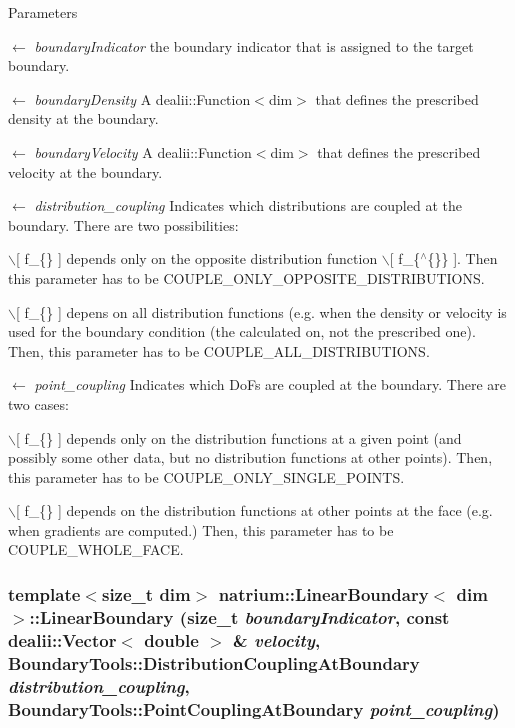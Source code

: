 \begin{DoxyParams}{Parameters}
\item[\mbox{$\leftarrow$} {\em boundaryIndicator}]the boundary indicator that is assigned to the target boundary. \item[\mbox{$\leftarrow$} {\em boundaryDensity}]A dealii::Function$<$dim$>$ that defines the prescribed density at the boundary. \item[\mbox{$\leftarrow$} {\em boundaryVelocity}]A dealii::Function$<$dim$>$ that defines the prescribed velocity at the boundary. \item[\mbox{$\leftarrow$} {\em distribution\_\-coupling}]Indicates which distributions are coupled at the boundary. There are two possibilities:
\begin{DoxyEnumerate}
\item $\backslash$\mbox{[} f\_\-\{\} \mbox{]} depends only on the opposite distribution function $\backslash$\mbox{[} f\_\-\{$^\wedge$\{\}\} \mbox{]}. Then this parameter has to be COUPLE\_\-ONLY\_\-OPPOSITE\_\-DISTRIBUTIONS.
\item $\backslash$\mbox{[} f\_\-\{\} \mbox{]} depens on all distribution functions (e.g. when the density or velocity is used for the boundary condition (the calculated on, not the prescribed one). Then, this parameter has to be COUPLE\_\-ALL\_\-DISTRIBUTIONS. 
\end{DoxyEnumerate}\item[\mbox{$\leftarrow$} {\em point\_\-coupling}]Indicates which DoFs are coupled at the boundary. There are two cases:
\begin{DoxyEnumerate}
\item $\backslash$\mbox{[} f\_\-\{\} \mbox{]} depends only on the distribution functions at a given point (and possibly some other data, but no distribution functions at other points). Then, this parameter has to be COUPLE\_\-ONLY\_\-SINGLE\_\-POINTS.
\item $\backslash$\mbox{[} f\_\-\{\} \mbox{]} depends on the distribution functions at other points at the face (e.g. when gradients are computed.) Then, this parameter has to be COUPLE\_\-WHOLE\_\-FACE. 
\end{DoxyEnumerate}\end{DoxyParams}
\hypertarget{classnatrium_1_1LinearBoundary_a7f0b83d5c09a113a1c9ad025704962f9}{
\subsubsection[{LinearBoundary}]{\setlength{\rightskip}{0pt plus 5cm}template$<$size\_\-t dim$>$ {\bf natrium::LinearBoundary}$<$ dim $>$::{\bf LinearBoundary} (size\_\-t {\em boundaryIndicator}, \/  const dealii::Vector$<$ double $>$ \& {\em velocity}, \/  BoundaryTools::DistributionCouplingAtBoundary {\em distribution\_\-coupling}, \/  BoundaryTools::PointCouplingAtBoundary {\em point\_\-coupling})}}
\label{classnatrium_1_1LinearBoundary_a7f0b83d5c09a113a1c9ad025704962f9}


